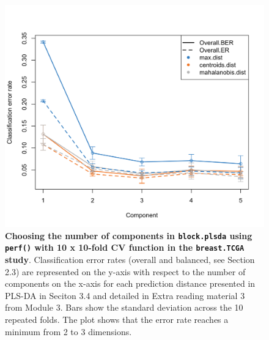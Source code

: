 \documentclass[]{book}
\newenvironment{Shaded}{\begin{snugshade}}{\end{snugshade}}
\newcommand{\KeywordTok}[1]{\textcolor[rgb]{0.13,0.29,0.53}{\textbf{#1}}}
\newcommand{\DataTypeTok}[1]{\textcolor[rgb]{0.13,0.29,0.53}{#1}}
\newcommand{\DecValTok}[1]{\textcolor[rgb]{0.00,0.00,0.81}{#1}}
\newcommand{\StringTok}[1]{\textcolor[rgb]{0.31,0.60,0.02}{#1}}
\newcommand{\CommentTok}[1]{\textcolor[rgb]{0.56,0.35,0.01}{\textit{#1}}}
\newcommand{\NormalTok}[1]{#1}
\begin{document}
\begin{Shaded}
\end{Shaded}

\begin{figure}

{\centering \includegraphics[width=0.5\linewidth]{Figures/DIABLO/diablo-perf-1} 

}

\caption{\textbf{Choosing the number of components in
\texttt{block.plsda} using \texttt{perf()} with 10 x 10-fold CV function
in the \texttt{breast.TCGA} study}. Classification error rates (overall
and balanced, see Section 2.3) are represented on the y-axis with
respect to the number of components on the x-axis for each prediction
distance presented in PLS-DA in Seciton 3.4 and detailed in Extra
reading material 3 from Module 3. Bars show the standard deviation
across the 10 repeated folds. The plot shows that the error rate reaches
a minimum from 2 to 3 dimensions.}\label{fig:diablo-perf}
\end{figure}
\end{document}
